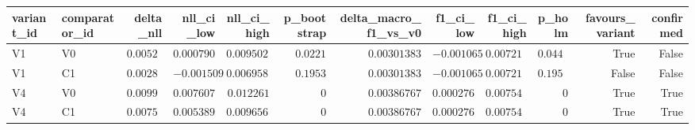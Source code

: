 \begin{tabular}{llrrrrrrrrrr}
\toprule
variant\_id & comparator\_id & delta\_nll & nll\_ci\_low & nll\_ci\_high & p\_bootstrap & delta\_macro\_f1\_vs\_v0 & f1\_ci\_low & f1\_ci\_high & p\_holm & favours\_variant & confirmed \\
\midrule
V1 & V0 & $0.00527229$ & $0.00079055$ & $0.00950227$ & $0.0221$ & $0.00301383$ & $-0.00106593$ & $0.00721356$ & $0.0442$ & True & False \\
V1 & C1 & $0.00284874$ & $-0.00150977$ & $0.00695826$ & $0.1953$ & $0.00301383$ & $-0.00106593$ & $0.00721356$ & $0.1953$ & False & False \\
V4 & V0 & $0.0099611$ & $0.0076073$ & $0.012261$ & $0$ & $0.00386767$ & $0.000276336$ & $0.00754135$ & $0$ & True & True \\
V4 & C1 & $0.00753754$ & $0.00538924$ & $0.00965657$ & $0$ & $0.00386767$ & $0.000276336$ & $0.00754135$ & $0$ & True & True \\
\bottomrule
\end{tabular}
